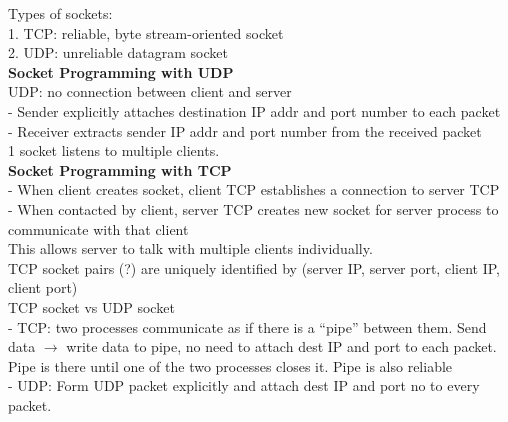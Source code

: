 \documentclass[10pt, a4paper]{article}
\newcommand{\blue}[1]{{\color{MidnightBlue}#1}}
\newcommand{\red}[1]{{\color{red}#1}}
\begin{document}
\begin{multicols*}{3}
		Types of sockets:\\
		1. TCP: reliable, byte stream-oriented socket\\
		2. UDP: unreliable datagram socket\\

		\textbf{Socket Programming with \red{UDP}}\\
		\red{UDP: no connection between client and server}\\
		- Sender explicitly attaches destination IP addr and port number to \red{each packet}\\
		- Receiver extracts sender IP addr and port number from the received packet\\
		\red{1} socket listens to \red{multiple} clients.\\

		\textbf{Socket Programming with \red{TCP}}\\
		- When client creates socket, client TCP establishes a connection to server TCP\\
		- When contacted by client, server TCP \red{creates} new socket for server process to communicate with that client\\
		This allows server to talk with multiple clients individually.\\
		TCP socket pairs (?) are uniquely identified by \blue{(server IP, server port, client IP, client port)}\\

		TCP socket vs UDP socket\\
		- TCP: two processes communicate as if there is a ``pipe'' between them. Send data $\rightarrow$ write data to pipe, \blue{no need to attach} dest IP and port to each packet. Pipe is there until one of the two processes closes it. Pipe is also \blue{reliable}\\
		- UDP: Form UDP packet explicitly and \blue{attach} dest IP and port no to every packet.\\







		
		
		
		
	\end{multicols*}
\end{document}
